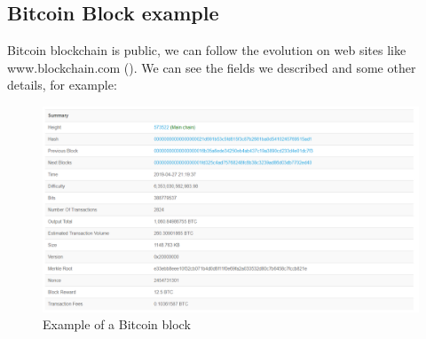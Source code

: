    \subsection{Bitcoin Block example}

  Bitcoin blockchain is public, we can follow the evolution on web sites like www.blockchain.com (\cite{blockchain_web_site}). We can see the fields we described and some other details, for example: \newline

  \begin{figure}[ht]
  \centering
  \includegraphics[width=15cm]{Figures/Block573522}
  \caption{Example of a Bitcoin block}
  \end{figure}

  \clearpage
